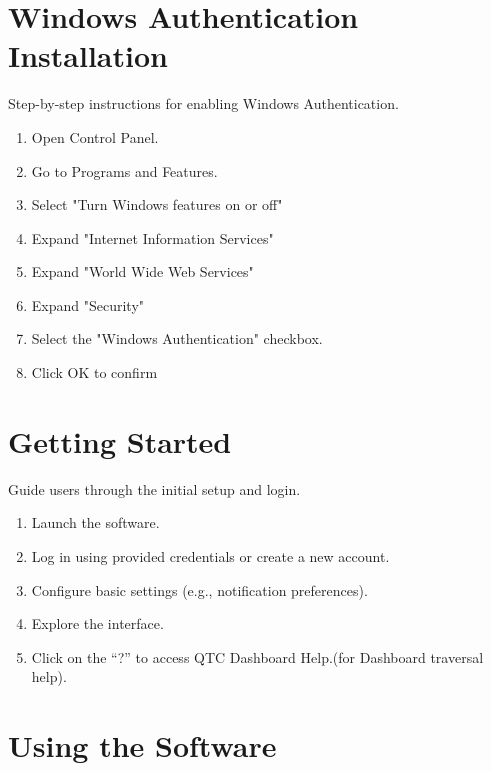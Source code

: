 \documentclass[12pt]{article}
\begin{document}
\section{Windows Authentication Installation}
Step-by-step instructions for enabling Windows Authentication.
\begin{enumerate}
    \item Open Control Panel.
    \item Go to Programs and Features.
    \item Select "Turn Windows features on or off"
    \item Expand "Internet Information Services"
    \item Expand "World Wide Web Services"
    \item Expand "Security"
    \item Select the "Windows Authentication" checkbox.
    \item Click OK to confirm
\end{enumerate}

\section{Getting Started}
Guide users through the initial setup and login.
\begin{enumerate}
    \item Launch the software.
    \item Log in using provided credentials or create a new account.
    \item Configure basic settings (e.g., notification preferences).
    \item Explore the interface.
    \item Click on the “?” to access QTC Dashboard Help.(for Dashboard traversal help).
\end{enumerate}

\section{Using the Software}
\end{document}
